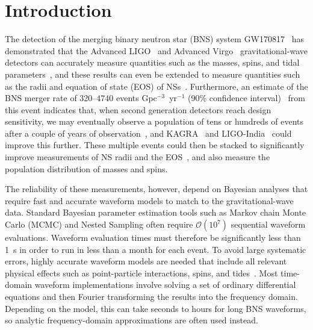\documentclass[prd,aps,letter,twocolumn,floatfix,notitlepage,nofootinbib]{revtex4-1}
\begin{document}
\maketitle



\section{Introduction}

The detection of the merging binary neutron star (BNS) system GW170817~\cite{GW170817} has demonstrated that the Advanced LIGO~\cite{Harry2010} and Advanced Virgo~\cite{Acernese2009} gravitational-wave detectors can accurately measure quantities such as the masses, spins, and tidal parameters~\cite{BNSPE}, and these results can even be extended to measure quantities such as the radii and equation of state (EOS) of NSs~\cite{RaithelOzelPsaltis2018, DeFinstadLattimer2018, EOSPaper}. Furthermore, an estimate of the BNS merger rate of 320--4740 events Gpc$^{-3}$~yr$^{-1}$ (90\% confidence interval)~\cite{GW170817} from this event indicates that, when second generation detectors reach design sensitivity, we may eventually observe a population of tens or hundreds of events after a couple of years of observation~\cite{LIGORate2010}, and KAGRA~\cite{Somiya2012} and LIGO-India~\cite{IyerSouradeepUnnikrishnan2011} could improve this further. These multiple events could then be stacked to significantly improve measurements of NS radii and the EOS~\cite{DelPozzoLiAgathos2013, LackeyWade2015}, and also measure the population distribution of masses and spins. 

The reliability of these measurements, however, depend on Bayesian analyses that require fast and accurate waveform models to match to the gravitational-wave data. Standard Bayesian parameter estimation tools such as Markov chain Monte Carlo (MCMC) and Nested Sampling often require $\mathcal{O}(10^7)$ sequential waveform evaluations. Waveform evaluation times must therefore be significantly less than 1~s in order to run in less than a month for each event. To avoid large systematic errors, highly accurate waveform models are needed that include all relevant physical effects such as point-particle interactions, spins, and tides~\cite{Favata2014, YagiYunes2014, WadeCreightonOchsner2014}. Most time-domain waveform implementations involve solving a set of ordinary differential equations and then Fourier transforming the results into the frequency domain. Depending on the model, this can take seconds to hours for long BNS waveforms, so analytic frequency-domain approximations are often used instead. 
\end{document}
